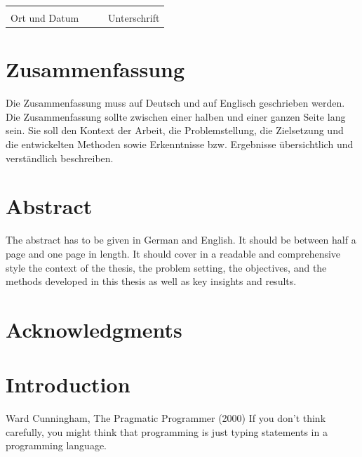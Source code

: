 \documentclass[
    pdftex,
    final,
    11pt,
    a4paper,
    parskip=false, %
    twoside, %
    footheight=0mm, %
    footinclude=false,
    toc=bibliography, %
    toc=listof %
]{scrbook} %
\begin{document}
\begin{otherlanguage}{ngerman}
\vspace{2cm}
	
\noindent\begin{tabularx}{\textwidth}{XXXX}
	&&& \\
	\cline{1-1}\cline{4-4}\footnotesize\centering Ort und Datum		&&& \footnotesize\centering Unterschrift
\end{tabularx}
	
\newpage

\chapter*{Zusammenfassung}

Die Zusammenfassung muss auf Deutsch und auf Englisch geschrieben werden. Die Zusammenfassung sollte zwischen einer halben und einer ganzen Seite lang sein. Sie soll den
Kontext der Arbeit, die Problemstellung, die Zielsetzung und die entwickelten Methoden
sowie Erkenntnisse bzw. Ergebnisse übersichtlich und verständlich beschreiben.

\end{otherlanguage}

\chapter*{Abstract}

The abstract has to be given in German and English. It should be between half a
page and one page in length. It should cover in a readable and comprehensive style the
context of the thesis, the problem setting, the objectives, and the methods developed in
this thesis as well as key insights and results.

\chapter*{Acknowledgments}

\lipsum[1-4]

\tableofcontents

\clearpage

\mainmatter %

\chapter{Introduction}
\label{ch:introduction}

\begin{chapter-quotation}{Ward Cunningham, The Pragmatic Programmer (2000)}
If you don't think carefully, you might think that programming is just typing statements in a programming language.
\end{chapter-quotation} 
\end{document}
